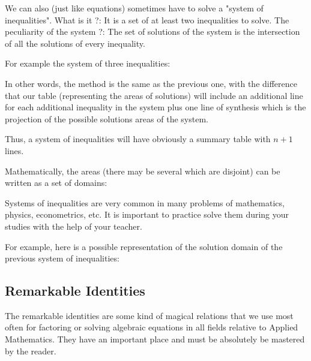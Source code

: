 	We can also (just like equations) sometimes have to solve a "system of inequalities". What is it ?: It is a set of at least two inequalities to solve. The peculiarity of the system ?: The set of solutions of the system is the intersection of all the solutions of every inequality.
	
	For example the system of three inequalities:
	
	In other words, the method is the same as the previous one, with the difference that our table (representing the areas of solutions) will include an additional line for each additional inequality in the system plus one line of synthesis which is the projection of the possible solutions areas of the system.
	
	Thus, a system of inequalities will have obviously a summary table with $n+1$ lines.
	
	Mathematically, the areas (there may be several which are disjoint) can be written as a set of domains:
	
	Systems of inequalities are very common in many problems of mathematics, physics, econometrics, etc. It is important to practice solve them during your studies with the help of your teacher.
	
	For example, here is a possible representation of the solution domain of the previous system of inequalities:
	\begin{center}
	\end{center}
	
	\subsection{Remarkable Identities}
	The remarkable identities are some kind of magical relations that we use most often for factoring or solving algebraic equations in all fields relative to Applied Mathematics. They have an important place and must be absolutely be mastered by the reader.
	
